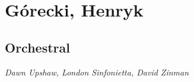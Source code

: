 \chapter{G\'{o}recki, Henryk} %
\label{cha:gorecki}

\section{Orchestral}

 \textit{Dawn Upshaw, London Sinfonietta, David Zinman} \\


